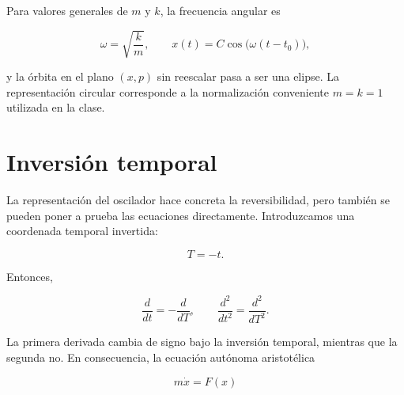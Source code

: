 Para valores generales de \(m\) y \(k\), la frecuencia angular es

\begin{equation}
  \omega=\sqrt{\frac{k}{m}},
  \qquad
  x(t)=C\cos\bigl(\omega(t-t_0)\bigr),
  \label{eq:general-oscillator-frequency}
\end{equation}

y la órbita en el plano \((x,p)\) sin reescalar pasa a ser una elipse. La representación circular corresponde a la normalización conveniente \(m=k=1\) utilizada en la clase.

\begin{classroomqa}\end{classroomqa}

\section{Inversión temporal}

La representación del oscilador hace concreta la reversibilidad, pero también se pueden poner a prueba las ecuaciones directamente. Introduzcamos una coordenada temporal invertida:

\begin{equation}
  T=-t.
  \label{eq:reverse-time}
\end{equation}

Entonces,

\begin{equation}
  \frac{d}{dt}=-\frac{d}{dT},
  \qquad
  \frac{d^2}{dt^2}=\frac{d^2}{dT^2}.
  \label{eq:time-derivative-parity}
\end{equation}

La primera derivada cambia de signo bajo la inversión temporal, mientras que la segunda no. En consecuencia, la ecuación autónoma aristotélica

\begin{equation}
  m\dot x=F(x)
  \label{eq:aristotle-time-reversal}
\end{equation}

